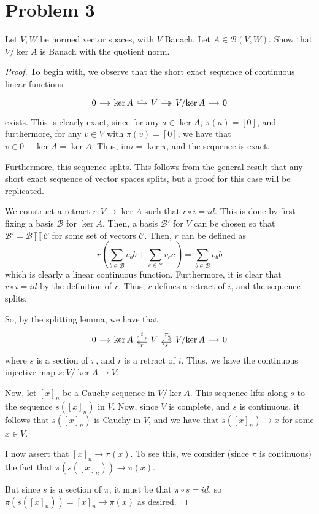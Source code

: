 \documentclass[fontsize=11pt]{scrartcl} %
\numberwithin{equation}{section} %
\numberwithin{figure}{section} %
\numberwithin{table}{section} %
\newcommand{\im}{\textrm{im}}
\begin{document}
\section*{Problem 3}
Let $V,W$ be normed vector spaces, with $V$ Banach. Let $A\in \mathscr{B}(V,W)$.
Show that $V/{\ker A}$ is Banach with the quotient norm.
\\
\begin{proof}
    To begin with, we observe that the short exact sequence of continuous linear
    functions
    \[
        \begin{tikzcd}[column sep=small]
            0\arrow{r} &\ker A \arrow[hook]{r}{i} &V\arrow[two heads]{r}{\pi} &V/{\ker
            A}\arrow{r} &0 
        \end{tikzcd}
    \]
    exists. This is clearly exact, since for any $a\in \ker A$, $\pi(a) =
    [0]$, and furthermore, for any $v\in V$ with $\pi(v) = [0]$, we have that
    $v\in 0+\ker A = \ker A$. Thus, $\im i = \ker \pi$, and the sequence is
    exact.

    Furthermore, this sequence splits. This follows from the general result that
    any short exact sequence of vector spaces splits, but a proof for this case
    will be replicated.

    We construct a retract $r:V\to \ker A$ such that $r\circ i=id$. This is done
    by first fixing a basis $\mathscr{B}$ for $\ker A$. Then, a basis
    $\mathscr{B}'$ for $V$ can be chosen so that $\mathscr{B}' =
    \mathscr{B}\coprod\mathscr{C}$ for some set of vectors $\mathscr{C}$.
    Then, $r$ can be defined as
    \[
        r\left(\sum_{b\in\mathscr{B}}v_b b + \sum_{c\in\mathscr{C}}v_c c\right)
        = \sum_{b\in\mathscr{B}} v_b b
    \]
    which is clearly a linear continuous function. Furthermore, it is clear that
    $r\circ i = id$ by the definition of $r$. Thus, $r$ defines a retract of
    $i$, and the sequence splits.

    So, by the splitting lemma, we have that
    \[
        \begin{tikzcd}[column sep=small]
            0\arrow{r} &\ker A \arrow[hook,shift left]{r}{i} &V\arrow[two
            heads, shift left]{r}{\pi}\arrow[two heads, shift left]{l}{r} &V/{\ker
            A}\arrow{r}\arrow[hook', shift left]{l}{s} &0 
        \end{tikzcd}
    \]
    where $s$ is a section of $\pi$, and $r$ is a retract of $i$. Thus, we have
    the continuous injective map $s:V/{\ker A}\to V$.

    Now, let $[x]_n$ be a Cauchy sequence in $V/{\ker A}$. This sequence lifts
    along $s$ to the sequence $s([x]_n)$ in $V$. Now, since $V$ is complete,
    and $s$ is continuous, it follows that $s([x]_n)$ is Cauchy in $V$, and
    we have that $s([x]_n)\to x$ for some $x\in V$. 
    
    I now assert that $[x]_n\to\pi(x)$. To see this, we consider (since $\pi$ is
    continuous) the fact that $\pi(s([x]_n))\to \pi(x)$.

    But since $s$ is a section of $\pi$, it must be that $\pi\circ s=id$, so
    $\pi(s([x]_n)) = [x]_n \to\pi(x)$ as desired.
\end{proof}
\end{document}

